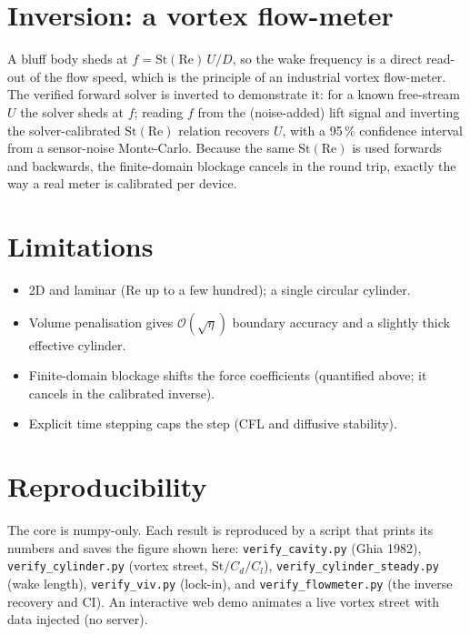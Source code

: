 \documentclass[11pt,a4paper]{article}
\begin{document}
\section{Inversion: a vortex flow-meter}
A bluff body sheds at $f = \mathrm{St}(\mathrm{Re})\,U/D$, so the wake frequency is a direct
read-out of the flow speed, which is the principle of an industrial vortex flow-meter. The verified
forward solver is inverted to demonstrate it: for a known free-stream $U$ the solver sheds at $f$;
reading $f$ from the (noise-added) lift signal and inverting the solver-calibrated
$\mathrm{St}(\mathrm{Re})$ relation recovers $U$, with a 95\,\% confidence interval from a
sensor-noise Monte-Carlo. Because the same $\mathrm{St}(\mathrm{Re})$ is used forwards and
backwards, the finite-domain blockage cancels in the round trip, exactly the way a real meter is
calibrated per device.

\section{Limitations}
\begin{itemize}
  \item 2D and laminar (Re up to a few hundred); a single circular cylinder.
  \item Volume penalisation gives $\mathcal{O}(\sqrt{\eta})$ boundary accuracy and a slightly
        thick effective cylinder.
  \item Finite-domain blockage shifts the force coefficients (quantified above; it cancels in the
        calibrated inverse).
  \item Explicit time stepping caps the step (CFL and diffusive stability).
\end{itemize}

\section{Reproducibility}
\begin{sloppypar}
The core is numpy-only. Each result is reproduced by a script that prints its numbers and saves the
figure shown here: \texttt{verify\_cavity.py} (Ghia 1982), \texttt{verify\_cylinder.py} (vortex
street, $\mathrm{St}/C_d/C_l$), \texttt{verify\_cylinder\_steady.py} (wake length),
\texttt{verify\_viv.py} (lock-in), and \texttt{verify\_flowmeter.py} (the inverse recovery and CI).
An interactive web demo animates a live vortex street with data injected (no server).
\end{sloppypar}
\end{document}
